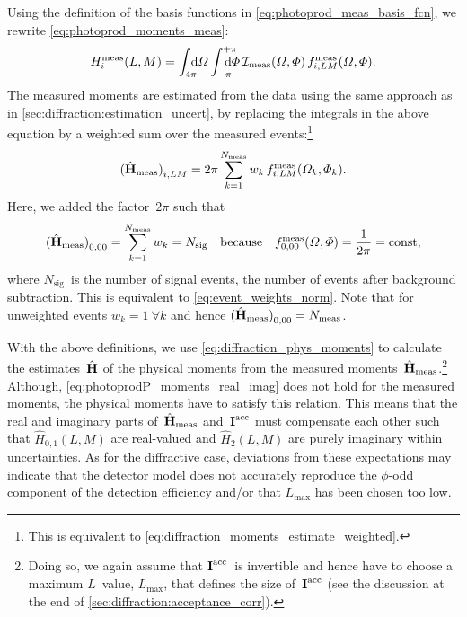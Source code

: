 Using the definition of the basis functions in
\cref{eq:photoprod_meas_basis_fcn}, we rewrite
\cref{eq:photoprod_moments_meas}:
\begin{equation}
  H_i^\text{meas}(L, M)
  = \int_{4 \pi}\!\!\!\! \dif{\Omega} \int_{-\pi}^{+\pi}\hspace{-1.2em} \dif{\Phi}\,
  \intensity_\text{meas}(\Omega, \Phi)\, f_{i, L M}^\text{meas}(\Omega, \Phi).
\end{equation}
The measured moments are estimated from the data using the same
approach as in \cref{sec:diffraction:estimation_uncert}, \ie by
replacing the integrals in the above equation by a weighted sum over
the measured events:\footnote{This is equivalent to
\cref{eq:diffraction_moments_estimate_weighted}.}
\begin{equation}
  \label{eq:photoprod_moments_meas_estimate_weighted}
  \rBrk[0]{\hat{\vect{H}}_\text{meas}}_{i, L M}
  = 2 \pi \sum_{k = 1}^{N_\text{meas}} w_k\, f_{i, L M}^\text{meas}(\Omega_k, \Phi_k).
\end{equation}
Here, we added the factor~$2 \pi$ such that
\begin{equation}
  \label{eq:photoprod_norm_00}
  \rBrk[0]{\hat{\vect{H}}_\text{meas}}_{0, 0 0}
  = \sum_{k = 1}^{N_\text{meas}} w_k
  = N_\text{sig}
  \quad\text{because}\quad
  f_{0, 0 0}^\text{meas}(\Omega, \Phi)
  = \frac{1}{2 \pi}
  = \text{const},
\end{equation}
where $N_\text{sig}$~is the number of signal events, \ie the number of
events after background subtraction.  This is equivalent to
\cref{eq:event_weights_norm}.  Note that for unweighted events $w_k =
1~ \forall k$ and hence $\rBrk[0]{\hat{\vect{H}}_\text{meas}}_{0, 0 0}
= N_\text{meas}$.

With the above definitions, we use \cref{eq:diffraction_phys_moments}
to calculate the estimates~$\hat{\bm{\mathrm{H}}}$ of the physical moments
from the measured moments~$\hat{\bm{\mathrm{H}}}_\text{meas}$.\footnote{Doing
so, we again assume that $\bm{\mathrm{I}}^\text{acc}$~is invertible and hence
have to choose a maximum $L$~value, $L_\text{max}$, that defines the
size of~$\bm{\mathrm{I}}^\text{acc}$ (see the discussion at the end of
\cref{sec:diffraction:acceptance_corr}).}  Although,
\cref{eq:photoprodP_moments_real_imag} does not hold for the measured
moments, the physical moments have to satisfy this relation.  This
means that the real and imaginary parts
of~$\hat{\bm{\mathrm{H}}}_\text{meas}$ and~$\bm{\mathrm{I}}^\text{acc}$ must
compensate each other such that $\hat{H}_{0, 1}(L, M)$ are real-valued
and $\hat{H}_2(L, M)$ are purely imaginary within uncertainties.  As
for the diffractive case, deviations from these expectations may
indicate that the detector model does not accurately reproduce the
$\phi$-odd component of the detection efficiency and/or that
$L_\text{max}$ has been chosen too low.

